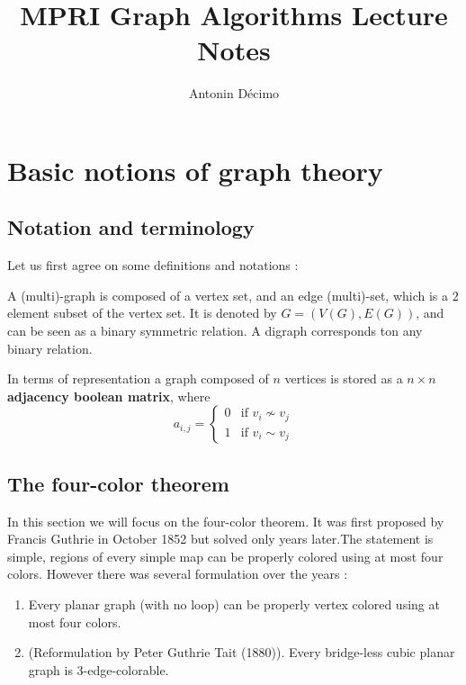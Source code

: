 \documentclass[12pt,a4paper]{article} \usepackage{fontspec}
\title{MPRI Graph Algorithms Lecture Notes} \author{Antonin Décimo}
\begin{document}
 \maketitle \tableofcontents

\section{Basic notions of graph theory}

\subsection{Notation and terminology}

Let us first agree on some definitions and notations :

\begin{definition} A (multi)-graph is composed of a vertex set, and
an edge (multi)-set, which is a \(2\) element subset of the vertex set.  It is
denoted by \(G = (V(G), E(G))\), and can be seen as a binary symmetric relation.
A digraph corresponds ton any binary relation.  \end{definition}

In terms of representation a graph composed of \(n\) vertices is stored as a \(n
\times n\) \textbf{adjacency boolean matrix}, where \[a_{i, j} = \begin{cases} 0
& \text{if } v_i \not\sim v_j\\ 1 & \text{if } v_i \sim v_j \end{cases}\]

\subsection{The four-color theorem}

In this section we will focus on  the four-color theorem. It was first proposed
by Francis Guthrie in October 1852 but solved only years later.The statement is
simple, regions of every simple map can be properly colored using at most four
colors. However there was several formulation over the years :

\begin{enumerate} \item Every planar graph (with no loop) can be properly vertex
colored using at most four colors.  \item (Reformulation by Peter Guthrie Tait
(1880)). Every bridge-less cubic planar graph is 3-edge-colorable.
\end{enumerate}
\end{document}
